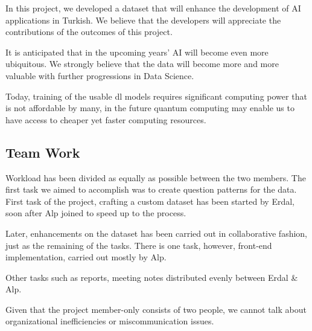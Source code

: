 \documentclass{mefsdp}
\begin{document}
	In this project, we developed a dataset that will enhance the development of AI applications in Turkish. We believe that the developers will appreciate the contributions of the outcomes of this project. \newline \par
	
	It is anticipated that in the upcoming years' AI will become even more ubiquitous. We strongly believe that the data will become more and more valuable with further progressions in Data Science. \newline \par
	
	Today, training of the usable \gls{dl} models requires significant computing power that is not affordable by many, in the future quantum computing may enable us to have access to cheaper yet faster computing resources. \newline \par
	
	\subsection{Team Work}
	Workload has been divided as equally as possible between the two members. The first task we aimed to accomplish was to create question patterns for the data. First task of the project, crafting a custom dataset has been started by Erdal, soon after Alp joined to speed up to the process. \newline \par 
	
	Later, enhancements on the dataset has been carried out in collaborative fashion, just as the remaining of the tasks. There is one task, however, front-end implementation, carried out mostly by Alp.  
	
	Other tasks such as reports, meeting notes distributed evenly between Erdal \& Alp.\newline \par
	
	Given that the project member-only consists of two people, we cannot talk about organizational inefficiencies or miscommunication issues. 
	
	\begin{appendix}
	\end{appendix}

	\begin{appendix}
	\end{appendix}
\end{document}
